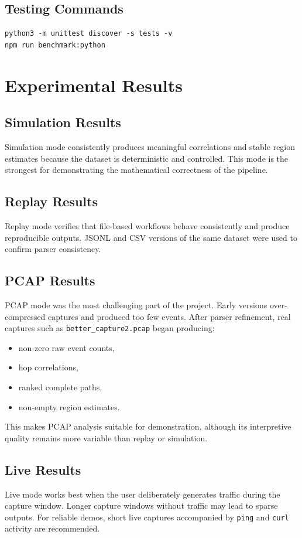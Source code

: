 \documentclass[12pt,a4paper]{report}
\begin{document}
\section{Testing Commands}
\begin{lstlisting}[style=codeblock]
python3 -m unittest discover -s tests -v
npm run benchmark:python
\end{lstlisting}

\chapter{Experimental Results}
\section{Simulation Results}
Simulation mode consistently produces meaningful correlations and stable region estimates because the dataset is deterministic and controlled. This mode is the strongest for demonstrating the mathematical correctness of the pipeline.

\section{Replay Results}
Replay mode verifies that file-based workflows behave consistently and produce reproducible outputs. JSONL and CSV versions of the same dataset were used to confirm parser consistency.

\section{PCAP Results}
PCAP mode was the most challenging part of the project. Early versions over-compressed captures and produced too few events. After parser refinement, real captures such as \texttt{better\_capture2.pcap} began producing:
\begin{itemize}[leftmargin=1.5em]
    \item non-zero raw event counts,
    \item hop correlations,
    \item ranked complete paths,
    \item non-empty region estimates.
\end{itemize}
This makes PCAP analysis suitable for demonstration, although its interpretive quality remains more variable than replay or simulation.

\section{Live Results}
Live mode works best when the user deliberately generates traffic during the capture window. Longer capture windows without traffic may lead to sparse outputs. For reliable demos, short live captures accompanied by \texttt{ping} and \texttt{curl} activity are recommended.
\end{document}
